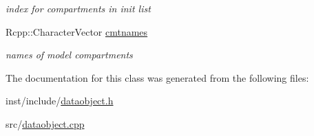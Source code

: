 \begin{DoxyCompactItemize}
\begin{DoxyCompactList}\small\item\em index for compartments in init list \end{DoxyCompactList}\item 
\mbox{\label{classdataobject_a5f253ce2cd8215febad559dfd663cb29}} 
Rcpp\+::\+Character\+Vector \hyperlink{classdataobject_a5f253ce2cd8215febad559dfd663cb29}{cmtnames}
\begin{DoxyCompactList}\small\item\em names of model compartments \end{DoxyCompactList}\end{DoxyCompactItemize}


The documentation for this class was generated from the following files\+:\begin{DoxyCompactItemize}
\item 
inst/include/\hyperlink{dataobject_8h}{dataobject.\+h}\item 
src/\hyperlink{dataobject_8cpp}{dataobject.\+cpp}\end{DoxyCompactItemize}
